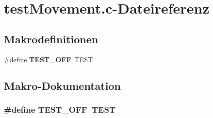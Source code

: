 \section{testMovement.c-\/Dateireferenz}
\label{test_movement_8c}
\subsection*{Makrodefinitionen}
\begin{DoxyCompactItemize}
\item 
\#define {\bf TEST\_\-OFF}~TEST
\end{DoxyCompactItemize}


\subsection{Makro-\/Dokumentation}
\subsubsection[{TEST\_\-OFF}]{\setlength{\rightskip}{0pt plus 5cm}\#define TEST\_\-OFF~TEST}\label{test_movement_8c_a8f6764e8e57eabbb14922404c0e25175}
